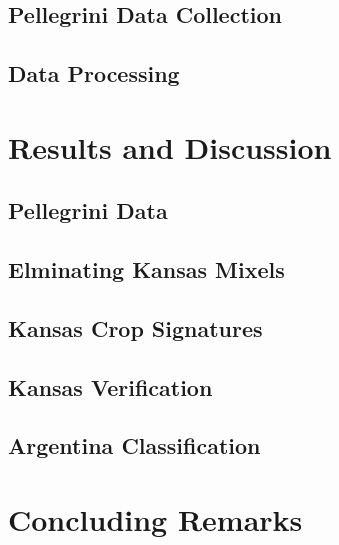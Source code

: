 \documentclass[compress]{beamer}
\begin{document}
\subsection{Pellegrini Data Collection}


\subsection{Data Processing}


\section{Results and Discussion}

\subsection{Pellegrini Data}

\subsection{Elminating Kansas Mixels}

\subsection{Kansas Crop Signatures}

\subsection{Kansas Verification}

\subsection{Argentina Classification}


\section{Concluding Remarks}
\end{document}
